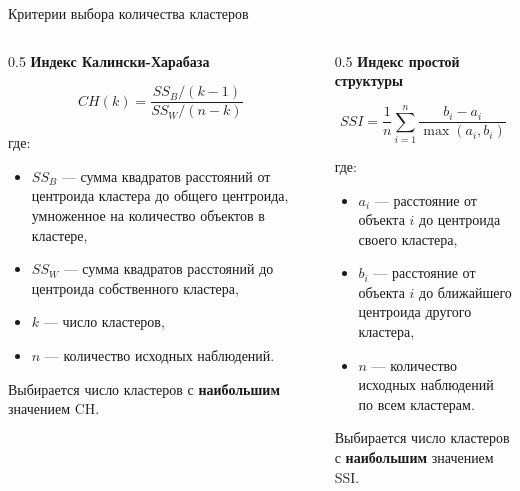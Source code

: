 \documentclass[
  ignorenonframetext,
  russian,
]{beamer}
\providecommand{\tightlist}{%
  \setlength{\itemsep}{0pt}\setlength{\parskip}{0pt}}
\begin{document}
\begin{frame}{Критерии выбора количества кластеров}
\protect{}\label{ux43aux440ux438ux442ux435ux440ux438ux438-ux432ux44bux431ux43eux440ux430-ux43aux43eux43bux438ux447ux435ux441ux442ux432ux430-ux43aux43bux430ux441ux442ux435ux440ux43eux432}
\begin{columns}[T]
\begin{column}{0.5\linewidth}
\textbf{Индекс Калински-Харабаза}

\[CH(k) = \frac{SS_B / (k-1)}{SS_W / (n-k)}\]

где:

\begin{itemize}
\tightlist
\item
  \(SS_B\) --- сумма квадратов расстояний от центроида кластера до
  общего центроида, умноженное на количество объектов в кластере,
\item
  \(SS_W\) --- сумма квадратов расстояний до центроида собственного
  кластера,
\item
  \(k\) --- число кластеров,
\item
  \(n\) --- количество исходных наблюдений.
\end{itemize}

Выбирается число кластеров с \textbf{наибольшим} значением CH.
\end{column}

\begin{column}{0.5\linewidth}
\textbf{Индекс простой структуры}

\[SSI = \frac{1}{n}\sum_{i=1}^{n} \frac{b_i - a_i}{\max(a_i, b_i)}\]

где:

\begin{itemize}
\tightlist
\item
  \(a_i\) --- расстояние от объекта \(i\) до центроида своего кластера,
\item
  \(b_i\) --- расстояние от объекта \(i\) до ближайшего центроида
  другого кластера,
\item
  \(n\) --- количество исходных наблюдений по всем кластерам.
\end{itemize}

Выбирается число кластеров с \textbf{наибольшим} значением SSI.
\end{column}
\end{columns}
\end{frame}
\end{document}
